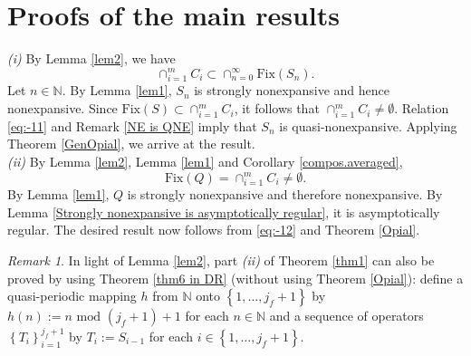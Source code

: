 \documentclass[]{interact}
\theoremstyle{plain}%
\theoremstyle{definition}
\theoremstyle{remark}
\newtheorem{remark}{Remark}
\begin{document}
\section{\label{sec5}Proofs of the main results}

\makeatletter \renewenvironment{proof}[1][\proofname\space of Theorem \ref{thm1}] {\par\pushQED{\qed}\normalfont\topsep6\p@\@plus6\p@\relax\trivlist\item[\hskip\labelsep\bfseries#1\@addpunct{.}]\ignorespaces}{\popQED\endtrivlist\@endpefalse} \makeatother
\begin{proof}
\textit{(i)} By Lemma \ref{lem2}, we have
\begin{equation}
\cap_{i=1}^{m}C_{i}\subset\cap_{n=0}^{\infty}\mathrm{Fix}(S_{n}).\label{eq:-11}
\end{equation}
Let $n\in\mathbb{N}$. By Lemma \ref{lem1}, $S_{n}$ is strongly
nonexpansive and hence nonexpansive. Since $\mathrm{Fix}(S)\subset\cap_{i=1}^{m}C_{i}$,
it follows that $\cap_{i=1}^{m}C_{i}\not=\emptyset$. Relation \eqref{eq:-11}
and Remark \ref{NE is QNE} imply that $S_{n}$ is quasi-nonexpansive.
Applying Theorem \ref{GenOpial}, we arrive at the result.\\
 \textit{(ii)} By Lemma \ref{lem2}, Lemma \ref{lem1} and Corollary
\ref{compos.averaged},
\begin{equation}
\mathrm{Fix}(Q)=\cap_{i=1}^{m}C_{i}\not=\emptyset.\label{eq:-12}
\end{equation}
By Lemma \ref{lem1}, $Q$ is strongly nonexpansive and therefore
nonexpansive. By Lemma \ref{Strongly nonexpansive  is asymptotically regular},
it is asymptotically regular. The desired result now follows from \eqref{eq:-12}
and Theorem \ref{Opial}.
\end{proof}
\begin{remark}
In light of Lemma \ref{lem2}, part \textit{(ii)} of \color{black}Theorem \ref{thm1} \color{black} can also be proved by using Theorem \ref{thm6 in DR} (without using Theorem
\ref{Opial}): define a quasi-periodic mapping $h$ from $\mathbb{N}$
onto $\left\{ 1,\dots,j_{f}+1\right\} $ by $h\left(n\right):=n\,\,\mathrm{mod\,}\,\left(j_{f}+1\right)+1$
for each $n\in\mathbb{N}$ and a sequence of operators $\left\{ T_{i}\right\} _{i=1}^{j_{f}+1}$
by $T_{i}:=S_{i-1}$ for each $i\in\left\{ 1,\dots,j_{f}+1\right\} $.
\end{remark}
\makeatletter \renewenvironment{proof}[1][\proofname\space of Theorem \ref{thm2}] {\par\pushQED{\qed}\normalfont\topsep6\p@\@plus6\p@\relax\trivlist\item[\hskip\labelsep\bfseries#1\@addpunct{.}]\ignorespaces}{\popQED\endtrivlist\@endpefalse} \makeatother
\end{document}
